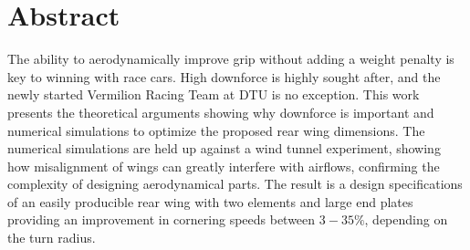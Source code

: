 \vspace{6cm}
\chapter*{Abstract}

The ability to aerodynamically improve grip without adding a weight penalty is key to winning with race cars. High downforce is highly sought after, and the newly started Vermilion Racing Team at DTU is no exception. This work presents the theoretical arguments showing why downforce is important and numerical simulations to optimize the proposed rear wing dimensions. The numerical simulations are held up against a wind tunnel experiment, showing how misalignment of wings can greatly interfere with airflows, confirming the complexity of designing aerodynamical parts. The result is a design specifications of an easily producible rear wing with two elements and large end plates providing an improvement in cornering speeds between $3-35\%$, depending on the turn radius.

